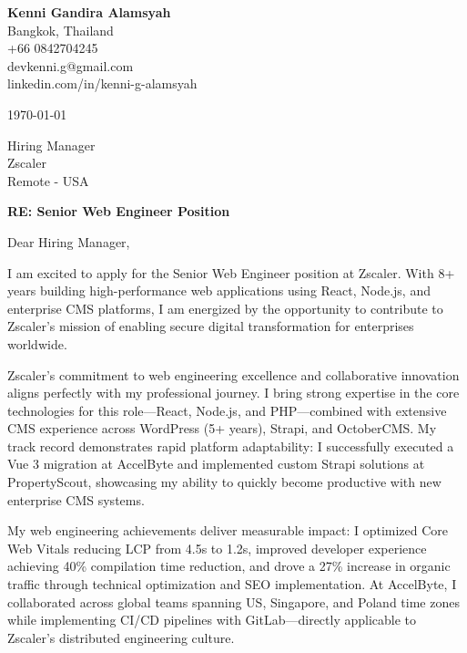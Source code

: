 \documentclass[11pt]{article}
\begin{document}
\begin{flushleft}
\textbf{Kenni Gandira Alamsyah} \\
Bangkok, Thailand \\
+66 0842704245 \\
devkenni.g@gmail.com \\
linkedin.com/in/kenni-g-alamsyah
\end{flushleft}

\vspace{1em}

\begin{flushleft}
\today
\end{flushleft}

\vspace{1em}

\begin{flushleft}
Hiring Manager \\
Zscaler \\
Remote - USA
\end{flushleft}

\vspace{1em}

\textbf{RE: Senior Web Engineer Position}

\vspace{1em}

Dear Hiring Manager,

I am excited to apply for the Senior Web Engineer position at Zscaler. With 8+ years building high-performance web applications using React, Node.js, and enterprise CMS platforms, I am energized by the opportunity to contribute to Zscaler's mission of enabling secure digital transformation for enterprises worldwide.

Zscaler's commitment to web engineering excellence and collaborative innovation aligns perfectly with my professional journey. I bring strong expertise in the core technologies for this role—React, Node.js, and PHP—combined with extensive CMS experience across WordPress (5+ years), Strapi, and OctoberCMS. My track record demonstrates rapid platform adaptability: I successfully executed a Vue 3 migration at AccelByte and implemented custom Strapi solutions at PropertyScout, showcasing my ability to quickly become productive with new enterprise CMS systems.

My web engineering achievements deliver measurable impact: I optimized Core Web Vitals reducing LCP from 4.5s to 1.2s, improved developer experience achieving 40\% compilation time reduction, and drove a 27\% increase in organic traffic through technical optimization and SEO implementation. At AccelByte, I collaborated across global teams spanning US, Singapore, and Poland time zones while implementing CI/CD pipelines with GitLab—directly applicable to Zscaler's distributed engineering culture.
\end{document}
